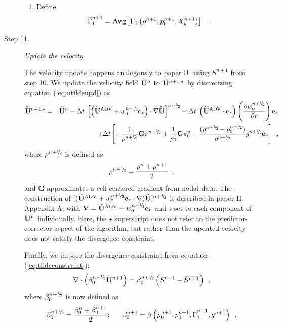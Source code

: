 \begin{description}
\begin{enumerate}
\item Define
\begin{equation}
 \overline{\Gamma}_1^{n+1} = {\rm{\bf Avg}}\left[\Gamma_1\left(\rho^{n+1}, p_0^{n+1}, 
X_k^{n+1}\right) \right] \enskip .
\end{equation}

\end{enumerate}


\item[Step 11.] {\em Update the velocity}.  

The velocity update happens analogously to paper II, using $S^{n+1}$ from step 10.
We update the velocity field $\widetilde{{\bf U}}^n$ to $\widetilde{{\bf U}}^{n+1,\star}$ by discretizing 
equation (\ref{eq:utildeupd}) as
\begin{eqnarray}
\Ubt^{n+1,\star} &=& \Ubt^n - \dt \;
 \left[\left(\uadvtwo+ w_0^{\nph} \eb_r\right) \cdot \nabla \Ubt \right]^\nph
      - \dt \; \left(\uadvtwo \cdot \eb_r\right)  \left(\frac{\partial w_0^{\nph}}{\partial r} \right) \eb_r \nonumber \\
   &&   + \dt \left[ - \frac{1}{\rho^\nph} {\mathbf{G}} \pi^\nmh
        + \frac{1}{\rho_0} {\mathbf{G}} \pi_0^n
        - \frac{(\rho^\nph-\rhozero^\nph)}{\rho^\nph} g^{n+\myhalf} \eb_r \right] \enskip ,
\end{eqnarray}
where $\rho^{\nph}$ is defined as
\begin{equation}
\rho^\nph = \frac{\rho^n + \rho^{n+1}}{2}\enskip ,
\end{equation}
and $\mathbf{G}$ approximates a cell-centered gradient from nodal data.
The construction of $[(\uadvtwo+ w_0^{\nph} \eb_r \cdot \nabla) \Ubt ]^\nph$
is described in paper II, Appendix A, with $\Vb = \uadvtwo+w_0^{\nph} \eb_r$ and $s$ 
set to each component of $\widetilde{{\bf U}}^n$ individually.  Here, the $\star$ superscript 
does not refer to the predictor-corrector aspect of the algorithm, but rather 
than the updated velocity does not satisfy the divergence constraint.

Finally, we impose the divergence constraint from equation (\ref{eq:tildeconstraint}):
\begin{equation}
\nabla \cdot \left(\beta_0^{\nph} \Ubt^{n+1} \right) 
= \beta_0^{\nph} \left(S^{n+1} - \overline{S^{n+1}} \right) \enskip,
\end{equation}
where $\beta_0^{n+\myhalf}$ is now defined as
\begin{equation}
\beta_0^{n+\myhalf} = \frac{\beta_0^n + \beta_0^{n+1}}{2}; ~~~~~ 
\beta_0^{n+1} = \beta \left(\rho_0^{n+1}, p_0^{n+1}, \gammabar^{n+1}, g^{n+1}\right)\enskip .
\end{equation}


\end{description}
